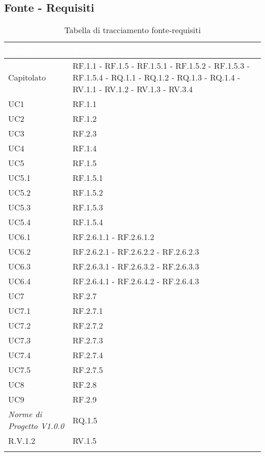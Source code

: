 \subsection{Fonte - Requisiti}
\begin{center}
  \centering
  \begin{longtable}{|C{6cm}|C{6cm}|}
    \hline
    \textcolor[HTML]{FFFFFF}{\textbf{Fonte}} & \textcolor[HTML]{FFFFFF}{\textbf{Requisiti}} \\ \hline
    Capitolato & RF.1.1 - RF.1.5 - RF.1.5.1 - RF.1.5.2 - RF.1.5.3 - RF.1.5.4 - RQ.1.1 - RQ.1.2 - RQ.1.3 - RQ.1.4 - RV.1.1 - RV.1.2 - RV.1.3 - RV.3.4 \\ \hline
    UC1 & RF.1.1 \\ \hline
    UC2 & RF.1.2 \\ \hline
    UC3 & RF.2.3 \\ \hline
    UC4 & RF.1.4 \\ \hline
    UC5 & RF.1.5 \\ \hline
    UC5.1 & RF.1.5.1 \\ \hline
    UC5.2 & RF.1.5.2 \\ \hline
    UC5.3 & RF.1.5.3 \\ \hline
    UC5.4 & RF.1.5.4 \\ \hline
    UC6.1 & RF.2.6.1.1 - RF.2.6.1.2 \\ \hline
    UC6.2 & RF.2.6.2.1 - RF.2.6.2.2 - RF.2.6.2.3  \\ \hline
    UC6.3 & RF.2.6.3.1 - RF.2.6.3.2 - RF.2.6.3.3 \\ \hline
    UC6.4 & RF.2.6.4.1 - RF.2.6.4.2 - RF.2.6.4.3  \\ \hline
    UC7 & RF.2.7 \\ \hline
    UC7.1 & RF.2.7.1 \\ \hline
    UC7.2 & RF.2.7.2 \\ \hline
    UC7.3 & RF.2.7.3 \\ \hline
    UC7.4 & RF.2.7.4 \\ \hline
    UC7.5 & RF.2.7.5 \\ \hline
    UC8 & RF.2.8 \\ \hline
    UC9 & RF.2.9 \\ \hline
    \textit{Norme di Progetto V1.0.0} & RQ.1.5 \\ \hline
    R.V.1.2 & RV.1.5 \\ \hline

    \caption{Tabella di tracciamento fonte-requisiti}
  \end{longtable}
\end{center}

